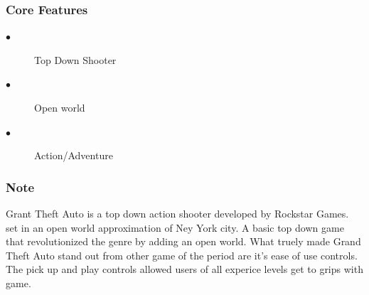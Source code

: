 \documentclass[a4paper]{scrreprt}
\begin{document}
            \subsubsection{Core Features}
                \begin{description}
                    \item[$\bullet$] Top Down Shooter
                    \item[$\bullet$] Open world
                    \item[$\bullet$] Action/Adventure
                \end{description}

                \subsubsection{Note}
                Grant Theft Auto is a top down action shooter developed by Rockstar Games. set in an open world approximation of Ney York city.
                A basic top down game that revolutionized the genre by adding an open world.
                What truely made Grand Theft Auto stand out from other game of the period are it's ease of use controls. 
                The pick up and play controls allowed users of all experice levels get to grips with game.
            
        
\end{document}
